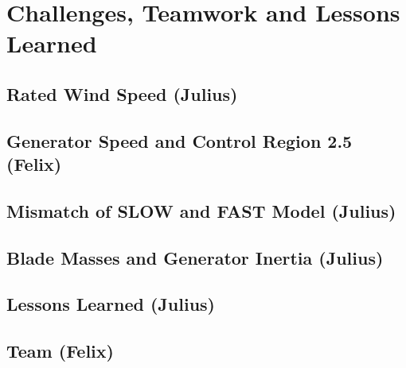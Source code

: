 \chapter{Challenges, Teamwork and Lessons Learned} \label{Challenges}
\section{Rated Wind Speed (Julius)} \label{RatedWindSpeed}


\section{Generator Speed and Control Region 2.5 (Felix)} \label{Region2d5}


\section{Mismatch of SLOW and FAST Model (Julius)}


\section{Blade Masses and Generator Inertia (Julius)}


\section{Lessons Learned (Julius)}


\section{Team (Felix)}



